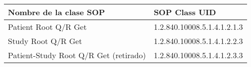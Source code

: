\begin{tabular}{|l|l|}
\hline
\textbf{Nombre de la clase SOP}       & \textbf{SOP Class UID}      \\ \hline
Patient Root Q/R Get                  & 1.2.840.10008.5.1.4.1.2.1.3 \\ \hline
Study Root Q/R Get                    & 1.2.840.10008.5.1.4.1.2.2.3 \\ \hline
Patient-Study Root Q/R Get (retirado) & 1.2.840.10008.5.1.4.1.2.3.3 \\ \hline
\end{tabular}
